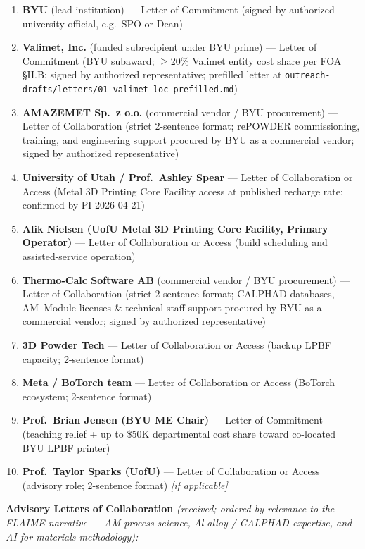 \documentclass[11pt,letterpaper]{article}
\begin{document}
\begin{enumerate}[leftmargin=*,nosep]\small
  \item \textbf{BYU} (lead institution) --- Letter of Commitment (signed by
        authorized university official, e.g.\ SPO or Dean)
  \item \textbf{Valimet, Inc.} (funded subrecipient under BYU prime) ---
        Letter of Commitment (BYU subaward; $\geq$20\% Valimet entity
        cost share per FOA \S II.B; signed by authorized representative;
        prefilled letter at \texttt{outreach-drafts/letters/01-valimet-loc-prefilled.md})
  \item \textbf{AMAZEMET Sp.\ z o.o.} (commercial vendor / BYU procurement)
        --- Letter of Collaboration (strict 2-sentence format; rePOWDER
        commissioning, training, and engineering support procured by BYU as
        a commercial vendor; signed by authorized representative)
  \item \textbf{University of Utah / Prof.\ Ashley Spear} --- Letter of
        Collaboration or Access (Metal 3D Printing Core Facility access
        at published recharge rate; confirmed by PI 2026-04-21)
  \item \textbf{Alik Nielsen (UofU Metal 3D Printing Core Facility, Primary
        Operator)} --- Letter of Collaboration or Access (build scheduling
        and assisted-service operation)
  \item \textbf{Thermo-Calc Software AB} (commercial vendor / BYU procurement)
        --- Letter of Collaboration (strict 2-sentence format; CALPHAD
        databases, AM~Module licenses \& technical-staff support procured by
        BYU as a commercial vendor; signed by authorized representative)
  \item \textbf{3D Powder Tech} --- Letter of Collaboration or Access
        (backup LPBF capacity; 2-sentence format)
  \item \textbf{Meta / BoTorch team} --- Letter of Collaboration or Access
        (BoTorch ecosystem; 2-sentence format)
  \item \textbf{Prof.\ Brian Jensen (BYU ME Chair)} --- Letter of Commitment
        (teaching relief + up to \$50K departmental cost share toward
        co-located BYU LPBF printer)
  \item \textbf{Prof.\ Taylor Sparks (UofU)} --- Letter of Collaboration or Access
        (advisory role; 2-sentence format) \textit{[if applicable]}
\end{enumerate}

\medskip
\noindent\textbf{Advisory Letters of Collaboration} \textit{(received;
ordered by relevance to the FLAIME narrative --- AM process science,
Al-alloy / CALPHAD expertise, and AI-for-materials methodology):}
\end{document}
